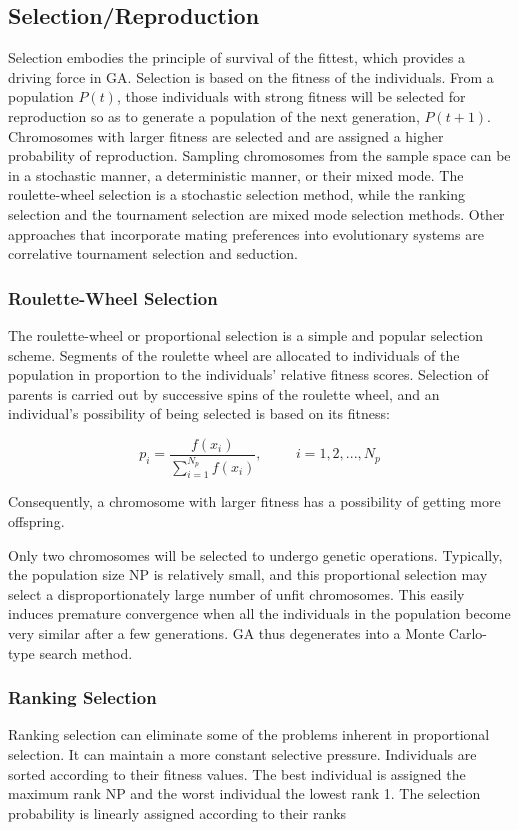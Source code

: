 \documentclass[14pt]{article}
\numberwithin{equation}{subsection}
\begin{document}
		\subsection{Selection/Reproduction}
		Selection embodies the principle of survival of the fittest, which provides a driving force in GA. Selection is
		based on the fitness of the individuals. From a population $P(t)$, those individuals with strong fitness will
		be selected for reproduction so as to generate a population of the next generation, $P(t + 1)$. Chromosomes with
		larger fitness are selected and are assigned a higher probability of reproduction. Sampling chromosomes from
		the sample space can be in a stochastic manner, a deterministic manner, or their mixed mode. The roulette-wheel
		selection is a stochastic selection method, while the ranking selection and the tournament selection are mixed
		mode selection methods. Other approaches that incorporate mating preferences into evolutionary systems
		are correlative tournament selection and seduction.
		
			\subsubsection{Roulette-Wheel Selection}
			The roulette-wheel or proportional selection is a simple and popular selection scheme. Segments of the
			roulette wheel are allocated to individuals of the population in proportion to the individuals’ relative
			fitness scores. Selection of parents is carried out by successive spins of the roulette wheel, and an
			individual’s possibility of being selected is based on its fitness:

			\[p_i = \frac{f(x_i)}{\sum_{i=1}^{N_p}{f(x_i)}}, \hspace{1cm} i = 1,2,...,N_p\]
			
			
			\noindent Consequently, a chromosome with larger fitness has a possibility of getting more offspring. \par
			Only two chromosomes will be selected to undergo genetic operations. Typically, the population size NP is
			relatively small, and this proportional selection may select a disproportionately large number of unfit
			chromosomes. This easily induces premature convergence when all the individuals in the population become very
			similar after a few generations. GA thus degenerates into a Monte Carlo-type search method.
			
			\subsubsection{Ranking Selection} Ranking selection can eliminate some of the problems inherent in proportional
			selection. It can maintain a more constant selective pressure. Individuals are sorted according to their
			fitness values. The best individual is assigned the maximum rank NP and the worst individual the lowest rank 1.
			The selection probability is linearly assigned according to their ranks
			
\end{document}
